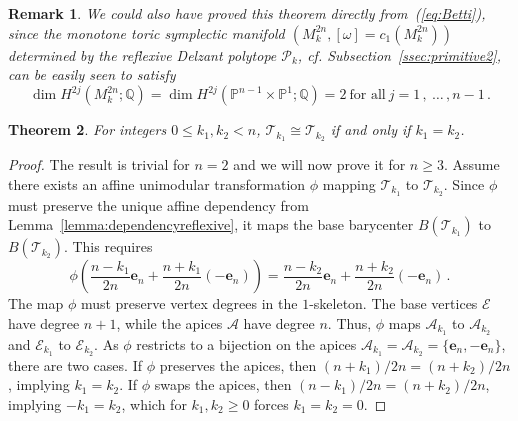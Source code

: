 \documentclass[a4paper,11pt,reqno]{amsart}
\newcommand{\Q}{\mathbb Q}
\newcommand{\CP}{\mathbb P}
\newcommand{\Aa}{{\mathcal A}}
\newcommand{\Ee}{{\mathcal E}}
\newcommand{\Pp}{{\mathcal P}}
\newtheorem{theorem}{Theorem}[section]
\newtheorem{remark}[theorem]{Remark}
\begin{document}
\begin{remark}
We could also have proved this theorem directly from~(\ref{eq:Betti}), since the monotone toric symplectic manifold
$(M^{2n}_k , [\omega] = c_1 (M^{2n}_k))$ determined by the reflexive Delzant polytope $\Pp_k$, 
cf. Subsection~\ref{ssec:primitive2}, can be easily seen to satisfy
\[
\dim H^{2j} (M^{2n}_k; \Q) = \dim H^{2j} (\CP^{n-1} \times \CP^1 ; \Q) = 2 \ \text{for all} \ j = 1\,, \ \ldots\,, n-1\,.
\]
\end{remark}

\begin{theorem}\label{thm:determinedreflexive}
For integers $0 \le k_1, k_2 < n$, $\mathcal{T}_{k_1} \cong \mathcal{T}_{k_2}$ if and only if $k_1 = k_2$.
\end{theorem}
\begin{proof}
The result is trivial for $n=2$ and we will now prove it for $n \ge 3$. Assume there exists an affine unimodular 
transformation $\phi$ mapping $\mathcal{T}_{k_1}$ to $\mathcal{T}_{k_2}$. Since $\phi$ must preserve the 
unique affine dependency from Lemma~\ref{lemma:dependencyreflexive}, it maps the base barycenter 
$B(\mathcal{T}_{k_1})$ to $B(\mathcal{T}_{k_2})$. This requires
\[
\phi \left( \frac{n-k_1}{2n} \bm{e}_n + \frac{n+k_1}{2n} (-\bm{e}_n) \right) = 
\frac{n-k_2}{2n} \bm{e}_n + \frac{n+k_2}{2n} (-\bm{e}_n)\,.
\]
The map $\phi$ must preserve vertex degrees in the $1$-skeleton. The base vertices $\Ee$ have degree $n+1$, 
while the apices $\Aa$ have degree $n$. Thus, $\phi$ maps $\Aa_{k_1}$ to $\Aa_{k_2}$ and 
$\Ee_{k_1}$ to $\Ee_{k_2}$. As $\phi$ restricts to a bijection on the apices $\Aa_{k_1} = \Aa_{k_2} = \{\bm{e}_n, -\bm{e}_n\}$, 
there are two cases. If $\phi$ preserves the apices, then $(n+k_1)/2n = (n+k_2)/2n$, implying $k_1 = k_2$. If $\phi$ 
swaps the apices, then $(n-k_1)/2n = (n+k_2)/2n$, implying $-k_1 = k_2$, which for $k_1, k_2 \ge 0$ forces 
$k_1 = k_2 = 0$.
\end{proof}
\end{document}
